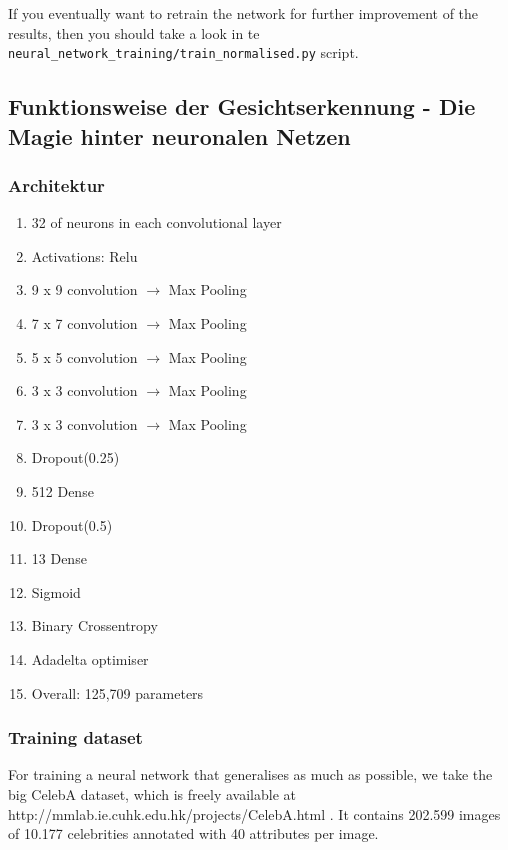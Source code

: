 \documentclass[12.5pt]{scrartcl}
\begin{document}
	If you eventually want to retrain the network for further improvement of the results, then you should take a look in te \texttt{neural\_network\_training/train\_normalised.py} script.
	\subsection{Funktionsweise der Gesichtserkennung - Die Magie hinter neuronalen Netzen}
	\subsubsection{Architektur}
	\begin{enumerate}
		\item 	32 of neurons in each convolutional layer
		\item Activations: Relu
		\item 9 x 9 convolution $\rightarrow$ Max Pooling
		\item	7 x 7 convolution $\rightarrow$  Max Pooling
		\item	5 x 5 convolution $\rightarrow$  Max Pooling
		\item	3 x 3 convolution $\rightarrow$  Max Pooling
		\item	3 x 3 convolution $\rightarrow$  Max Pooling
		\item	Dropout(0.25)
		\item	512 Dense
		\item	Dropout(0.5)
		\item	13 Dense
		\item	Sigmoid
		\item	Binary Crossentropy
		\item	Adadelta optimiser
		\item Overall: 125,709 parameters
	\end{enumerate}
	\subsubsection{Training dataset}
	For training a neural network that generalises as much as possible, we take the big CelebA dataset, which is freely available at http://mmlab.ie.cuhk.edu.hk/projects/CelebA.html . It contains 202.599 images of 10.177 celebrities annotated with 40 attributes per image.
\end{document}
